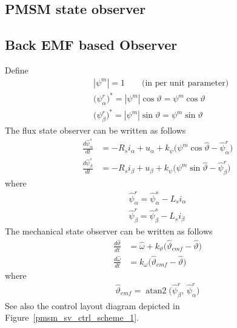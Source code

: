\documentclass[11pt,a4paper]{article}
\numberwithin{equation}{section}
\DeclareMathOperator{\atantwo}{atan2}
\newcommand{\abs}[1]{\left|#1\right|}
\theoremstyle{it}
\theoremstyle{definition}
\begin{document}
\begin{onehalfspace}
\section{PMSM state observer}	
\subsection{Back EMF based Observer}
Define
\begin{align}
	&\abs{\psi^m} = 1\qquad\text{(in per unit parameter)} \label{emf_state_obse_eq1} \\[6pt]
	&\Big(\psi_{\alpha}^r\Big)^* = \abs{\psi^m}\cos\vartheta = \psi^m\cos\vartheta \label{emf_state_obse_eq2} \\[6pt]
	&\Big(\psi_{\beta}^r\Big)^* = \abs{\psi^m}\sin\vartheta = \psi^m\sin\vartheta \label{emf_state_obse_eq3}
\end{align}
The flux state observer can be written as follows
\begin{align}
	\frac{d\hat{\psi}_{\alpha}^s}{dt} &= -R_s i_{\alpha} + u_{\alpha} + k_\psi \Big(\psi^m\cos\hat{\vartheta}-\hat{\psi}_{\alpha}^r\Big) \label{emf_state_obse_eq4} \\[6pt]
	\frac{d\hat{\psi}_{\beta}^s}{dt} &= -R_s i_{\beta} + u_{\beta} + k_\psi \Big(\psi^m\sin\hat{\vartheta}-\hat{\psi}_{\beta}^r\Big) \label{emf_state_obse_eq5}
\end{align}
where
\begin{align}
	\hat{\psi}_{\alpha}^r = \hat{\psi}_{\alpha}^s -L_s i_{\alpha} \label{emf_state_obse_eq6} \\[6pt]
	\hat{\psi}_{\beta}^r = \hat{\psi}_{\beta}^s -L_s i_{\beta} \label{emf_state_obse_eq7}
\end{align}
The mechanical state observer can be written as follows
\begin{align}
	\frac{d\hat{\vartheta}}{dt} &= \hat{\omega} + k_{\vartheta}\Big(\hat{\vartheta}_{emf} - \hat{\vartheta}\Big) \label{emf_state_obse_eq8} \\[6pt]
	\frac{d\hat{\omega}}{dt} &= k_{\omega}\Big(\hat{\vartheta}_{emf} - \hat{\vartheta}\Big) \label{emf_state_obse_eq9}
\end{align}
where 
\begin{align}
	\hat{\vartheta}_{emf} = \atantwo\big(\hat{\psi}_{\beta}^r,\,\hat{\psi}_{\alpha}^r\big) \label{emf_state_obse_eq10}
\end{align}
See also the control layout diagram depicted in Figure~\ref{pmsm_sv_ctrl_scheme_1}.


\end{onehalfspace}
\end{document}
